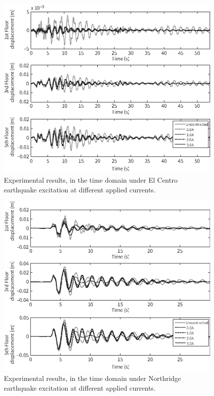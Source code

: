 \begin{figure}[H]
\centering
\includegraphics[width=1\textwidth] {figure/8-16.eps}
\caption{Experimental results, in the time domain under El Centro earthquake excitation at different applied currents.}
\label{fig:8-16}
\end{figure}

\begin{figure}[H]
\centering
\includegraphics[width=1\textwidth] {figure/8-17.eps}
\caption{Experimental results, in the time domain under Northridge earthquake excitation at different applied currents.}
\label{fig:8-17}
\end{figure}

